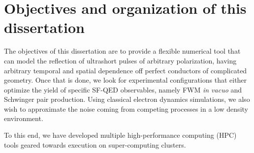 \documentclass[11pt,SymmetricalJury]{inrsthesis/inrsthesis}
\begin{document}
\section{Objectives and organization of this dissertation}
\label{sec:intro.objectives}

The objectives of this dissertation are to provide a flexible numerical tool that
can model the reflection of ultrashort pulses of arbitrary polarization, having
arbitrary temporal and spatial dependence off perfect conductors of complicated
geometry. Once that is done, we look for experimental configurations that either
optimize the yield of specific SF-QED observables, namely FWM \textit{in vacuo}
and Schwinger pair production. Using classical electron dynamics simulations, we
also wish to approximate the noise coming from competing processes in a low
density environment.

To this end, we have developed multiple high-performance computing (HPC) tools
geared towards execution on super-computing clusters.
\end{document}
